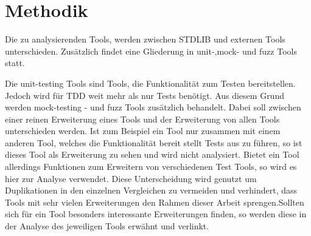 \section{Methodik}\label{methodik}
Die zu analysierenden Tools, werden zwischen STDLIB und externen Tools 
unterschieden. Zusätzlich findet eine Gliederung in unit-,\gls{mock}- und 
\gls{fuzz} Tools statt.

Die unit-testing Tools sind Tools, die Funktionalität zum Testen bereitstellen.
Jedoch wird für TDD weit mehr als nur Tests benötigt. Aus diesem Grund werden
\gls{mock}-testing - und \gls{fuzz} Tools zusätzlich behandelt. Dabei soll
zwischen einer reinen Erweiterung eines Tools und der Erweiterung von allen
Tools unterschieden werden. Ist zum Beispiel ein Tool nur zusammen mit einem
anderen Tool, welches die Funktionalität bereit stellt Tests aus zu führen,
so ist dieses Tool als Erweiterung zu sehen und wird nicht analysiert. Bietet
ein Tool allerdings Funktionen zum Erweitern von verschiedenen Test Tools, so
wird es hier zur  Analyse verwendet. Diese Unterscheidung wird genutzt um
Duplikationen in den einzelnen Vergleichen zu vermeiden und verhindert, dass
Tools mit sehr vielen Erweiterungen den Rahmen dieser Arbeit sprengen.Sollten
sich für ein Tool besonders interessante Erweiterungen finden, so werden diese
in der Analyse des jeweiligen Tools erwähnt und verlinkt.
\newline

